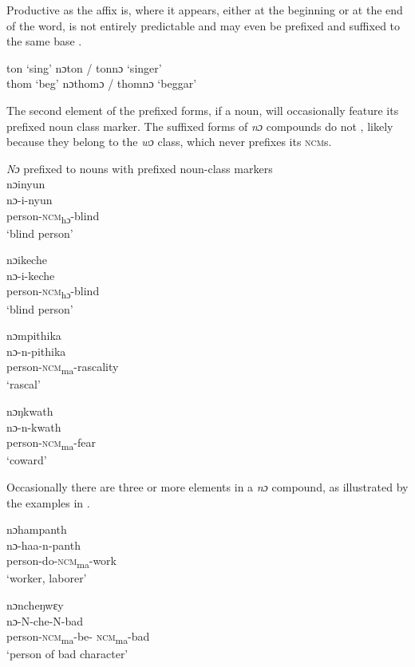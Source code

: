 Productive as the affix is, where it appears, either at the beginning or at the end of the word, is not entirely predictable and may even  be prefixed and suffixed to the same base .

\ea%
    \label{ex:176}
    ton \tab ‘sing' \tab nɔton / tonnɔ \tab ‘singer'\\
    thom \tab ‘beg' \tab nɔthomɔ / thomnɔ \tab ‘beggar'\\   
\z

The second element of the prefixed forms, if a noun, will occasionally feature its prefixed noun class marker. The suffixed forms of \textit{nɔ} compounds do not , likely because they belong to the \textit{wɔ} class, which never prefixes its \textsc{ncm}s.

\ea%
    \label{ex:177} \textit{Nɔ} prefixed to nouns with prefixed noun-class markers\\
    
    \ea nɔinyun\\
    \gll nɔ-i-nyun\\
    person-\textsc{ncm}\textsubscript{hɔ}{}-blind\\
    \glt ‘blind person'

    \ex nɔikeche\\
    \gll nɔ-i-keche\\
    person-\textsc{ncm}\textsubscript{hɔ}{}-blind\\
    \glt ‘blind person'

 \ex nɔmpithika\\
    \gll nɔ-n-pithika\\
    person-\textsc{ncm}\textsubscript{ma}{}-rascality\\
    \glt ‘rascal'
    
    \ex nɔŋkwath\\
    \gll nɔ-n-kwath\\
    person-\textsc{ncm}\textsubscript{ma}{}-fear\\
    \glt ‘coward'
\z
\z

Occasionally there are three or more elements in a \textit{nɔ} compound, as illustrated by the examples in .

\ea%
    \label{ex:178}
    \ea nɔhampanth\\
    \gll nɔ-haa-n-panth\\
    person-do-\textsc{ncm}\textsubscript{ma}{}-work\\
    \glt ‘worker, laborer'

    \ex nɔncheŋwɛy\\
    \gll nɔ-N-che-N-bad\\
    person-\textsc{ncm}\textsubscript{ma}{}-be- \textsc{ncm}\textsubscript{ma}{}-bad\\
    \glt ‘person of bad character'
    \z
\z

